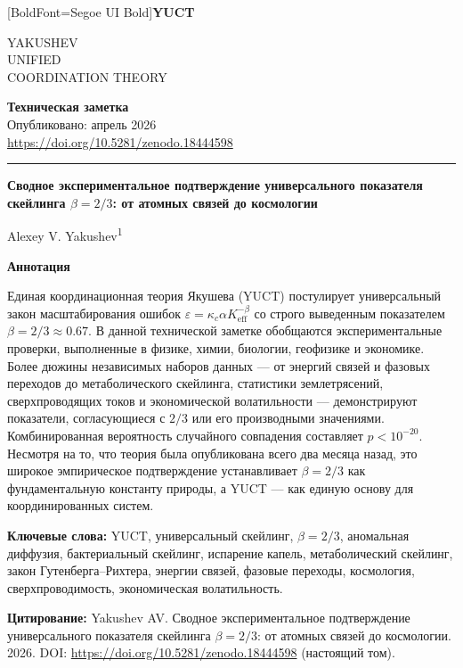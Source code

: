 \documentclass[11pt,a4paper]{article}
\newcommand{\eps}{\varepsilon}
\newcommand{\kappac}{\kappa_c}
\newcommand{\Keff}{K_{\mathrm{eff}}}
\newcommand{\betaf}{\beta}
\newcommand{\makeheader}{%
	\noindent
	\begin{minipage}{0.17\textwidth}
		\raggedright
		{\fontspec{Segoe UI}[BoldFont=Segoe UI Bold]\bfseries\color{skyblue}\fontsize{46}{46}\selectfont YUCT}%
	\end{minipage}%
	\hspace{30pt}
	\begin{minipage}{0.32\textwidth}
		\raggedright
		{\sffamily\fontsize{11}{13}\selectfont YAKUSHEV\\ UNIFIED\\ COORDINATION THEORY}%
	\end{minipage}%
	\hfill
	\begin{minipage}{0.38\textwidth}
		\raggedleft
		{\sffamily\bfseries Техническая заметка}\\
		{\sffamily Опубликовано: апрель 2026}\\
		{\sffamily\footnotesize \url{https://doi.org/10.5281/zenodo.18444598}}%
	\end{minipage}
	\par\vspace{5pt}
	\noindent\textcolor{gold}{\rule{\textwidth}{1.6pt}}
	\par\vspace{0pt}
}
\begin{document}
	\thispagestyle{firstpage}
	\makeheader
	
	\vspace{0cm}
	{\LARGE\bfseries Сводное экспериментальное подтверждение универсального показателя скейлинга \(\betaf = 2/3\): от атомных связей до космологии \par}
	\vspace{0.2cm}
	
	{\large Alexey V. Yakushev\textsuperscript{1}} \\
	\vspace{0.0cm}
	
	{\color{darkblue}\textbf{\LARGE Аннотация}} \par
	{\large
		\noindent
		Единая координационная теория Якушева (YUCT) постулирует универсальный закон масштабирования ошибок \(\eps = \kappac \alpha \Keff^{-\betaf}\) со строго выведенным показателем \(\betaf = 2/3 \approx 0.67\). В данной технической заметке обобщаются экспериментальные проверки, выполненные в физике, химии, биологии, геофизике и экономике. Более дюжины независимых наборов данных — от энергий связей и фазовых переходов до метаболического скейлинга, статистики землетрясений, сверхпроводящих токов и экономической волатильности — демонстрируют показатели, согласующиеся с \(2/3\) или его производными значениями. Комбинированная вероятность случайного совпадения составляет \(p < 10^{-20}\). Несмотря на то, что теория была опубликована всего два месяца назад, это широкое эмпирическое подтверждение устанавливает \(\betaf = 2/3\) как фундаментальную константу природы, а YUCT — как единую основу для координированных систем.}
	
	\vspace{0.1cm}
	\noindent
	{\color{darkblue}\textbf{Ключевые слова:}} YUCT, универсальный скейлинг, \(\beta = 2/3\), аномальная диффузия, бактериальный скейлинг, испарение капель, метаболический скейлинг, закон Гутенберга–Рихтера, энергии связей, фазовые переходы, космология, сверхпроводимость, экономическая волатильность.
	
	\vspace{0.1cm}
	\noindent
	{\color{darkblue}\textbf{Цитирование:}} Yakushev AV. Сводное экспериментальное подтверждение универсального показателя скейлинга \(\beta = 2/3\): от атомных связей до космологии. 2026. DOI: \url{https://doi.org/10.5281/zenodo.18444598} (настоящий том).
	
\end{document}
